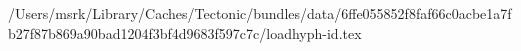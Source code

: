/Users/msrk/Library/Caches/Tectonic/bundles/data/6ffe055852f8faf66c0acbe1a7fb27f87b869a90bad1204f3bf4d9683f597c7c/loadhyph-id.tex